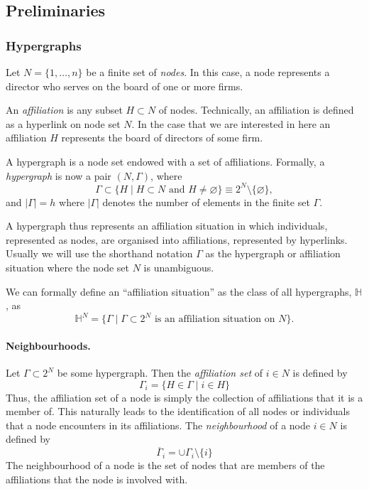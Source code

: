 \subsection{Preliminaries}

\subsubsection*{Hypergraphs}

Let $N = \{ 1, \ldots ,n \}$ be a finite set of \emph{nodes}. In this case, a node represents a director who serves on the board of one or more firms.

An \emph{affiliation} is any subset $H \subset N$ of nodes. Technically, an affiliation is defined as a hyperlink on node set $N$. In the case that we are interested in here an affiliation $H$ represents the board of directors of some firm.

A hypergraph is a node set endowed with a set of affiliations. Formally, a \emph{hypergraph} is now a pair $(N, \Gamma )$, where
\begin{equation}
\Gamma \subset \{ H \mid H \subset N \mbox{ and } H \neq \varnothing \} \equiv 2^N \setminus \{\varnothing\} ,
\end{equation}
and $| \Gamma | = h$ where $| \Gamma |$ denotes the number of elements in the finite set $\Gamma$.

A hypergraph thus represents an affiliation situation in which individuals, represented as nodes, are organised into affiliations, represented by hyperlinks. Usually we will use the shorthand notation $\Gamma$ as the hypergraph or affiliation situation where the node set $N$ is unambiguous.

We can formally define an ``affiliation situation'' as the class of all hypergraphs, $\mathbb{H}$, as
\begin{equation}
\mathbb{H}^N = \{ \Gamma \mid \Gamma \subset 2^N \mbox{ is an affiliation situation on } N \} .
\end{equation}

\paragraph{Neighbourhoods.}

Let $\Gamma \subset 2^N$ be some hypergraph. Then the \emph{affiliation set} of $i \in N$ is defined by
\begin{equation}
\Gamma_i = \{ H \in \Gamma \mid i \in H \}
\end{equation}
Thus, the affiliation set of a node is simply the collection of affiliations that it is a member of. This naturally leads to the identification of all nodes or individuals that a node encounters in its affiliations. The \emph{neighbourhood} of a node $i \in N$ is defined by
\begin{equation}
\overline{\Gamma}_i = \cup \Gamma_i \setminus \{ i \}
\end{equation}
The neighbourhood of a node is the set of nodes that are members of the affiliations that the node is involved with.

